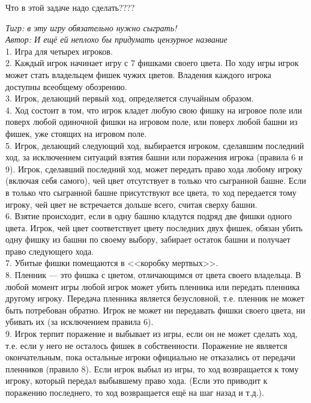 \begin{problem} 
{\red Что в этой задаче надо сделать????}

{\it Тигр: в эту игру обязательно нужно сыграть!}\\
{\it Автор: И ещё ей неплохо бы придумать цензурное название}\\
1. Игра для четырех игроков.\\
2. Каждый игрок начинает игру с 7 фишками своего цвета. По ходу игры игрок может стать владельцем фишек чужих цветов. Владения каждого игрока доступны всеобщему обозрению.\\
3. Игрок, делающий первый ход, определяется случайным образом.\\
4. Ход состоит в том, что игрок кладет любую свою фишку на игровое поле или поверх любой одиночной фишки на игровом поле, или поверх любой башни из фишек, уже стоящих на игровом поле.\\
5. Игрок, делающий следующий ход, выбирается игроком, сделавшим последний ход, за исключением ситуаций взятия башни или поражения игрока (правила 6 и 9). Игрок, сделавший последний ход, может передать право хода любому игроку (включая себя самого), чей цвет отсутствует в только что сыгранной башне. Если в только что сыгранной башне присутствуют все цвета, то ход передается тому игроку, чей цвет не встречается дольше всего, считая сверху башни.\\
6. Взятие происходит, если в одну башню кладутся подряд две фишки одного цвета. Игрок, чей цвет соответствует цвету последних двух фишек, обязан убить одну фишку из башни по своему выбору, забирает остаток башни и получает право следующего хода.\\
7. Убитые фишки помещаются в <<коробку мертвых>>.\\
8. Пленник --- это фишка с цветом, отличающимся от цвета своего владельца. В любой момент игры любой игрок может убить пленника или передать пленника другому игроку. Передача пленника является безусловной, т.е. пленник не может быть потребован обратно. Игрок не может ни передавать фишки своего цвета, ни убивать их (за исключением правила 6).\\
9. Игрок терпит поражение и выбывает из игры, если он не может сделать ход, т.е. если у него не осталось фишек в собственности. Поражение не является окончательным, пока остальные игроки официально не отказались от передачи пленников (правило 8). Если игрок выбыл из игры, то ход возвращается к тому игроку, который передал выбывшему право хода. (Если это приводит к поражению последнего, то ход возвращается ещё на шаг назад и т.д.).\\

\end{problem}
